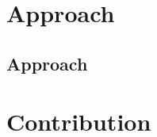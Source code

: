 \documentclass[compress,red]{beamer}
\begin{document}
\section{Approach}
\subsection{Approach}

%

\section{Contribution}
\end{document}
